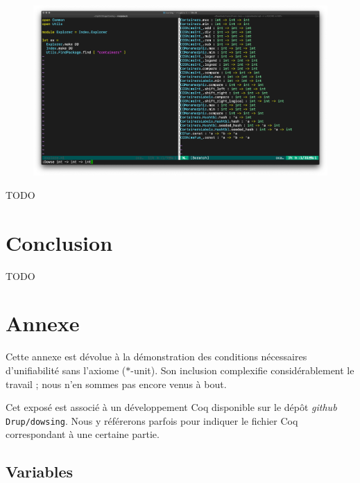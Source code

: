 \documentclass [a4paper] {report}
\theoremstyle {definition}
\begin{document}
\begin {figure} [h]
\begin {center}
	\includegraphics [scale=0.18] {images/vim_plugin}
\end {center}
\end {figure}

TODO


\chapter {Conclusion}

TODO


\chapter* {Annexe}

Cette annexe est dévolue à la démonstration des conditions nécessaires d'unifiabilité sans l'axiome ($*$-unit). Son inclusion complexifie considérablement le travail ; nous n'en sommes pas encore venus à bout.

Cet exposé est associé à un développement Coq disponible sur le dépôt \textit {github} \texttt {Drup/dowsing}. Nous y référerons parfois pour indiquer le fichier Coq correspondant à une certaine partie.


\section {Variables}
\end{document}
